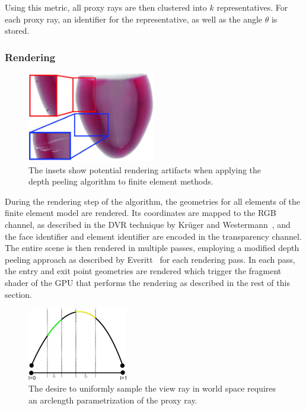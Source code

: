 Using this metric, all proxy rays are then clustered into $k$ representatives.  For each proxy ray, an identifier for the representative, as well as the angle $\theta$ is stored.



\subsubsection{Rendering} \label{contributions:fem:rendering}
\begin{figure}
    \centering
    \includegraphics[width=0.5\textwidth]{figures/contributions/fem/heartfine.jpg}
    \caption{The insets show potential rendering artifacts when applying the depth peeling algorithm to finite element methods.}
    \label{contributions:fem:peeling}
\end{figure}
During the rendering step of the algorithm, the geometries for all elements of the finite element model are rendered.  Its coordinates are mapped to the RGB channel, as described in the DVR technique by Kr\"uger and Westermann~\cite{kruger2003acceleration}, and the face identifier and element identifier are encoded in the transparency channel.  The entire scene is then rendered in multiple passes, employing a modified depth peeling approach as described by Everitt~\cite{everitt2001interactive} for each rendering pass.  In each pass, the entry and exit point geometries are rendered which trigger the fragment shader of the GPU that performs the rendering as described in the rest of this section.

\begin{figure}
\centering
\includegraphics[width=0.39\textwidth]{figures/contributions/fem/arclength.pdf}
\caption{The desire to uniformly sample the view ray in world space requires an arclength parametrization of the proxy ray.}
\label{contributions:fem:arclength}
\end{figure}

